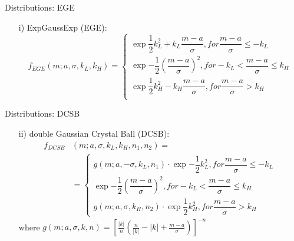 \documentclass[10pt]{beamer} %
\begin{document}
\begin{frame}{Distributions: EGE}
    \begin{itemize}
        \item[i)] ExpGaussExp (EGE):
        \begin{equation}
            f_{EGE}(m; a, \sigma, k_L, k_H) = \begin{cases}
\exp{\dfrac{1}{2}k_L^2 + k_L\dfrac{m-a}{\sigma}}, for \dfrac{m-a}{\sigma} \leq - k_L \\
\exp{-\dfrac{1}{2}\left( \dfrac{m-a}{\sigma} \right)^2}, for - k_L < \dfrac{m-a}{\sigma} \leq k_H\\
\exp{\dfrac{1}{2}k_H^2 - k_H\dfrac{m-a}{\sigma}}, for \dfrac{m-a}{\sigma} >  k_H \\
\end{cases}
        \end{equation}
    \end{itemize}
        

\end{frame}

\begin{frame}{Distributions: DCSB}

\begin{itemize}
    \begin{itemize}
        \item[ii)] double Gaussian Crystal Ball (DCSB):
\begin{align*}
    f_{DCSB} & (m; a, \sigma, k_L, k_H, n_1, n_2) = \\ 
    & = \begin{cases}
g(m;a, -\sigma, k_L, n_1)\cdot \exp{-\dfrac{1}{2}k_L^2}, for \dfrac{m-a}{\sigma} \leq - k_L \\
\exp{-\dfrac{1}{2}\left( \dfrac{m-a}{\sigma} \right)^2}, for - k_L < \dfrac{m-a}{\sigma} \leq k_H\\
g(m; a, \sigma, k_H,n_2)\cdot\exp{\dfrac{1}{2}k_H^2}, for \dfrac{m-a}{\sigma} >  k_H
\end{cases}
\end{align*}
where $g(m;a, \sigma,k,n) = \left[ \frac{|k|}{n} \left(\frac{n}{|k|} - |k| + \frac{m-a}{\sigma} \right) \right]^{-n}$
    \end{itemize}
\end{itemize}


\end{frame}
\end{document}
